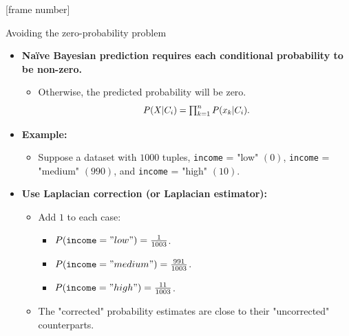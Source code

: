 \documentclass[aspectratio=169,t,table]{beamer}
\begin{document}
  {
    [frame number]
    \begin{frame}{Avoiding the zero-probability problem}
      \begin{itemize}
        \item \textbf{Naïve Bayesian prediction requires each conditional probability to be non-zero.}
        \begin{itemize}
          \item Otherwise, the predicted probability will be zero.
          \begin{align}
            \resizebox{4cm}{!}{
            $P(X|C_i) = \prod_{k=1}^{n} P(x_k|C_i).$}
          \end{align}
        \end{itemize}
        \item \textbf{Example:}
        \begin{itemize}
          \item Suppose a dataset with $1000$ tuples, \texttt{income} = "low" $(0)$, \texttt{income} = "medium" $(990)$, and \texttt{income} = "high" $(10)$.
        \end{itemize}
        \item \textbf{Use {\color{airforceblue}Laplacian correction} (or Laplacian estimator):}
        \begin{itemize}
          \item Add $1$ to each case:
          \begin{itemize}
            \item $P(\texttt{income} = "low") = \frac{1}{1003}$.
            \item $P(\texttt{income} = "medium") = \frac{991}{1003}$.
            \item $P(\texttt{income} = "high") = \frac{11}{1003}$.
          \end{itemize}
          \item The "corrected" probability estimates are close to their "uncorrected" counterparts.
        \end{itemize}
      \end{itemize}
    \end{frame}
  }
\end{document}
